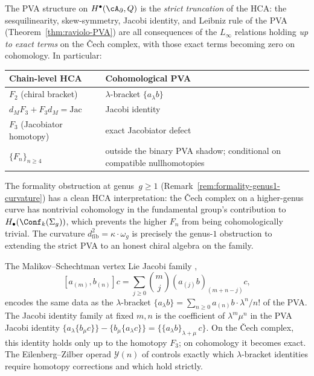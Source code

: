 \begin{remark}
The PVA structure on $H^\bullet(\cA_\partial, Q)$ is the
\emph{strict truncation} of the HCA: the sesquilinearity,
skew-symmetry, Jacobi identity, and Leibniz rule of the PVA
(Theorem~\ref{thm:raviolo-PVA}) are all consequences of the
$L_\infty$ relations holding \emph{up to exact terms} on the
\v{C}ech complex, with those exact terms becoming zero on
cohomology. In particular:
\begin{center}
\renewcommand{\arraystretch}{1.2}
\begin{tabular}{ll}
\textbf{Chain-level HCA} & \textbf{Cohomological PVA} \\
\hline
$F_2$ (chiral bracket) & $\lambda$-bracket $\{a_\lambda b\}$ \\
$d_M F_3 + F_3 d_M = \mathrm{Jac}$ & Jacobi identity \\
$F_3$ (Jacobiator homotopy) & exact Jacobiator defect \\
$\{F_n\}_{n \geq 4}$ & outside the binary PVA shadow; conditional on
compatible nullhomotopies \\
\end{tabular}
\end{center}
The formality obstruction at genus~$g \geq 1$
(Remark~\ref{rem:formality-genus1-curvature}) has a clean HCA
interpretation: the \v{C}ech complex on a higher-genus curve has
nontrivial cohomology in the fundamental group's contribution to
$H_\bullet(\Conf_k(\Sigma_g))$, which prevents the higher
$F_n$ from being cohomologically trivial. The curvature
$d_{\mathrm{fib}}^2 = \kappa \cdot \omega_g$ is precisely
the genus-$1$ obstruction to extending the strict PVA to an
honest chiral algebra on the family.
\end{remark}

\begin{remark}
The Malikov--Schechtman vertex Lie Jacobi family \cite{MS24},
\[
[a_{(m)}, b_{(n)}]c
= \sum_{j \geq 0} \binom{m}{j}(a_{(j)}b)_{(m+n-j)}c,
\]
encodes the same data as the $\lambda$-bracket
$\{a_\lambda b\} = \sum_{n \geq 0} a_{(n)}b \cdot \lambda^n/n!$
of the PVA\@. The Jacobi identity family at fixed $m,n$ is the
coefficient of $\lambda^m \mu^n$ in the PVA Jacobi identity
$\{a_\lambda \{b_\mu c\}\} - \{b_\mu \{a_\lambda c\}\}
= \{\{a_\lambda b\}_{\lambda+\mu}\, c\}$.
On the \v{C}ech complex, this identity holds only up to the
homotopy $F_3$; on cohomology it becomes exact. The
Eilenberg--Zilber operad $\mathcal{Y}(n)$ of \cite{MS24}
controls exactly which $\lambda$-bracket identities require
homotopy corrections and which hold strictly.
\end{remark}

